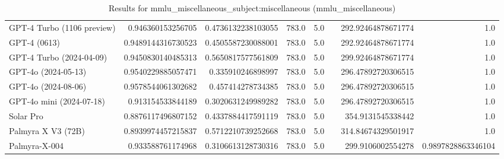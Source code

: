 \begin{table}[htp]
{\begin{tabular}{lrrrrrrr}
GPT-4 Turbo (1106 preview) & 0.946360153256705 & 0.4736132238103055 & 783.0 & 5.0 &  & 292.92464878671774 & 1.0 \\
GPT-4 (0613) & 0.9489144316730523 & 0.4505587230088001 & 783.0 & 5.0 &  & 292.92464878671774 & 1.0 \\
GPT-4 Turbo (2024-04-09) & 0.9450830140485313 & 0.5650817577561809 & 783.0 & 5.0 &  & 299.92464878671774 & 1.0 \\
GPT-4o (2024-05-13) & 0.9540229885057471 & 0.335910246898997 & 783.0 & 5.0 &  & 296.47892720306515 & 1.0 \\
GPT-4o (2024-08-06) & 0.9578544061302682 & 0.457414278734385 & 783.0 & 5.0 &  & 296.47892720306515 & 1.0 \\
GPT-4o mini (2024-07-18) & 0.913154533844189 & 0.3020631249989282 & 783.0 & 5.0 &  & 296.47892720306515 & 1.0 \\
Solar Pro & 0.8876117496807152 & 0.4337884417591119 & 783.0 & 5.0 &  & 354.9131545338442 & 1.0 \\
Palmyra X V3 (72B) & 0.8939974457215837 & 0.5712210739252668 & 783.0 & 5.0 &  & 314.84674329501917 & 1.0 \\
Palmyra-X-004 & 0.933588761174968 & 0.3106613128730316 & 783.0 & 5.0 &  & 299.9106002554278 & 0.9897828863346104 \\
\bottomrule
\end{tabular}}
\caption{Results for mmlu_miscellaneous_subject:miscellaneous (mmlu_miscellaneous)}
\label{fig:mmlu_miscellaneous_subject:miscellaneous (mmlu_miscellaneous)}
\end{table}